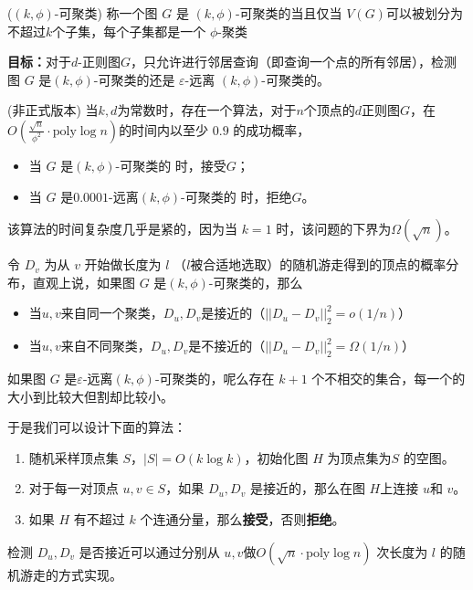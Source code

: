 \documentclass[lang=cn,newtx,10pt,scheme=chinese,chinesefont=nofont,citestyle=gb7714-2015, bibstyle=gb7714-2015]{elegantbook}
\begin{document}
\begin{refsection}
\begin{definition}{($(k,\phi)$-可聚类)}
    称一个图 $G$ 是 $(k,\phi)$-可聚类的当且仅当 $V(G)$可以被划分为不超过$k$个子集，每个子集都是一个 $\phi$-聚类
\end{definition}

\textbf{目标：}对于$d$-正则图$G$，只允许进行邻居查询（即查询一个点的所有邻居），检测图 $G$ 是$(k,\phi)$-可聚类的还是 $\varepsilon$-远离 $(k,\phi)$-可聚类的。

\begin{theorem}{(非正式版本)}
    当$k,d$为常数时，存在一个算法，对于$n$个顶点的$d$正则图$G$，在$O(\frac{\sqrt{n}}{\phi^2}\cdot\mathrm{poly}\log n)$的时间内以至少 $0.9$ 的成功概率，
    \begin{itemize}
        \item 当 $G$ 是$(k,\phi)$-可聚类的 时，接受$G$；
        \item 当 $G$ 是$0.0001$-远离$(k,\phi)$-可聚类的 时，拒绝$G$。
    \end{itemize}
\end{theorem}

该算法的时间复杂度几乎是紧的，因为当 $k=1$ 时，该问题的下界为$\Omega(\sqrt{n})$。

令 $D_v$ 为从 $v$ 开始做长度为 $l$ （$l$被合适地选取）的随机游走得到的顶点的概率分布，直观上说，如果图 $G$ 是$(k,\phi)$-可聚类的，那么
\begin{itemize}
    \item 当$u,v$来自同一个聚类，$D_u,D_v$是接近的（$||D_u-D_v||_2^2=o(1/n)$）
    \item 当$u,v$来自不同聚类，$D_u,D_v$是不接近的（$||D_u-D_v||_2^2=\Omega(1/n)$）
\end{itemize}

如果图 $G$ 是$\varepsilon$-远离$(k,\phi)$-可聚类的，呢么存在 $k+1$ 个不相交的集合，每一个的大小到比较大但割却比较小。

于是我们可以设计下面的算法：
\begin{enumerate}
    \item 随机采样顶点集 $S$，$|S|=O(k\log k)$，初始化图 $H$ 为顶点集为$S$ 的空图。
    \item 对于每一对顶点 $u,v\in S$，如果 $D_u,D_v$ 是接近的，那么在图 $H$上连接 $u$和 $v$。
    \item 如果 $H$ 有不超过 $k$ 个连通分量，那么\textbf{接受}，否则\textbf{拒绝}。
\end{enumerate}

检测 $D_u,D_v$ 是否接近可以通过分别从 $u,v$做$O(\sqrt{n}\cdot\mathrm{poly}\log n)$ 次长度为 $l$ 的随机游走的方式实现。

\end{refsection}
\end{document}
